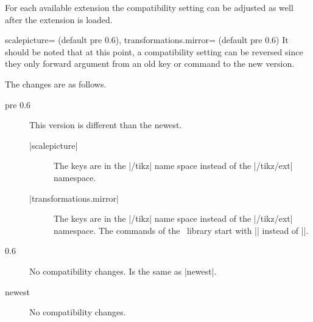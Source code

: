\begin{multicols}{2}
\newcolumn
For each available extension the compatibility setting can be adjusted as well
after the extension is loaded.
\begin{keylist}{%
  scalepicture= (default pre 0.6),
  transformations.mirror= (default pre 0.6)}
  It should be noted that at this point, a compatibility setting can be reversed
  since they only forward argument from an old key or command to the new version.
  
  The changes are as follows.
  \begin{description}
  \item[pre 0.6] This version is different than the newest.
    \begin{description}
    \item[|scalepicture|] The keys are in the |/tikz| name space instead of the |/tikz/ext| namespace.
    \item[|transformations.mirror|]
      The keys are in the |/tikz| name space instead of the |/tikz/ext| namespace.
      The commands of the \pgfname\ library start with |\pgf| instead of |\pgfext|.
    \end{description}
  \item[0.6] No compatibility changes. Is the same as |newest|.
  \item[newest] No compatibility changes.
  \end{description}
\end{keylist}
\end{multicols}